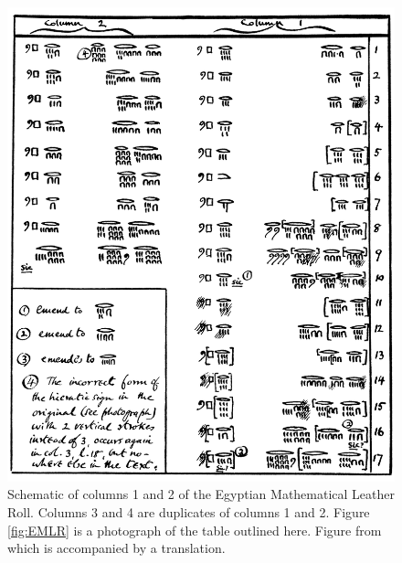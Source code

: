 \begin{figure}
  \centering
  \includegraphics[width=\textwidth]{gfx/EMLRschematic}
  \caption[Schematic of columns 1 and 2 of the Egyptian Mathematical Leather Roll.]
  {Schematic of columns 1 and 2 of the Egyptian Mathematical Leather Roll. Columns 3 and 4 are duplicates of columns 1 and 2. Figure \ref{fig:EMLR} is a photograph of the table outlined here. Figure from \citet{Glanville27} which is accompanied by a translation.}
  \label{fig:EMLRschematic}
\end{figure}


